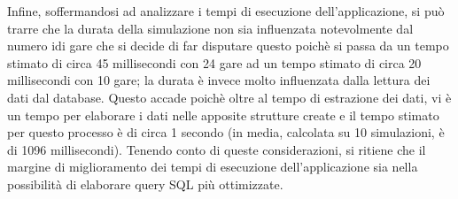 Infine, soffermandosi ad analizzare i tempi di esecuzione dell'applicazione, si può trarre che la durata della simulazione non sia influenzata notevolmente dal numero idi gare che si decide di far disputare questo poichè si passa da un tempo stimato di circa 45 millisecondi con 24 gare ad un tempo stimato di circa 20 millisecondi con 10 gare; la durata è invece molto influenzata dalla lettura dei dati dal database. Questo accade poichè oltre al tempo di estrazione dei dati, vi è un tempo per elaborare i dati nelle apposite strutture create e il tempo stimato per questo processo è di circa 1 secondo (in media, calcolata su 10 simulazioni, è di 1096 millisecondi). Tenendo conto di queste considerazioni, si ritiene che il margine di miglioramento dei tempi di esecuzione dell'applicazione sia nella possibilità di elaborare query SQL più ottimizzate.